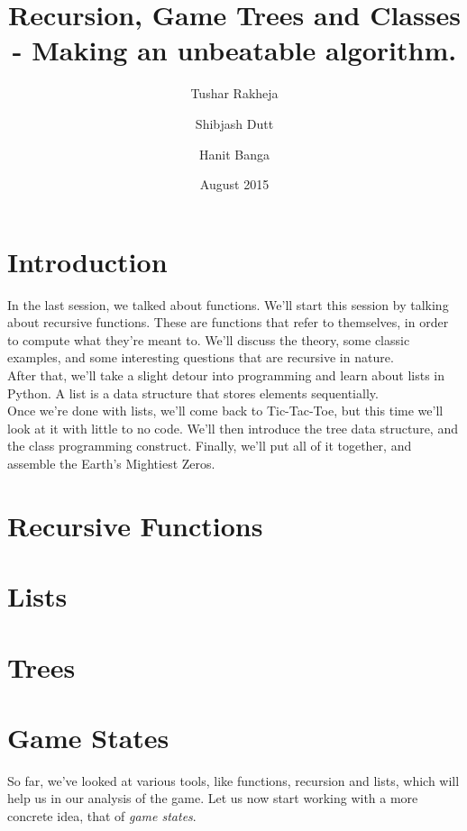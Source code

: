 \documentclass{article}
\title{Recursion, Game Trees and Classes - Making an unbeatable algorithm.}
\author[]{Tushar Rakheja}
\author[]{Shibjash Dutt}
\author[]{Hanit Banga}
\affil[]{\texttt{Instructors @ Endofline Computer Club}}
\date{August 2015}
\begin{document}
\maketitle

\section{Introduction}

In the last session, we talked about functions. We'll start this session by talking about recursive functions. These are functions that refer to themselves, in order to compute what they're meant to. We'll discuss the theory, some classic examples, and some interesting questions that are recursive in nature. \\

\noindent After that, we'll take a slight detour into programming and learn about lists in Python. A list is a data structure \cite{DSinPres_Slide} that stores elements sequentially.\\

\noindent Once we're done with lists, we'll come back to Tic-Tac-Toe, but this time we'll look at it with little to no code. We'll then introduce the tree data structure, and the class programming construct. Finally, we'll put all of it together, and assemble the Earth's Mightiest Zeros. 

\section{Recursive Functions}

\section{Lists}

\section{Trees}

\section{Game States} 

So far, we've looked at various tools, like functions, recursion and lists,
which will help us in our analysis of the game. Let us now start working with
a more concrete idea, that of \textit{game states}. \\
\end{document}
